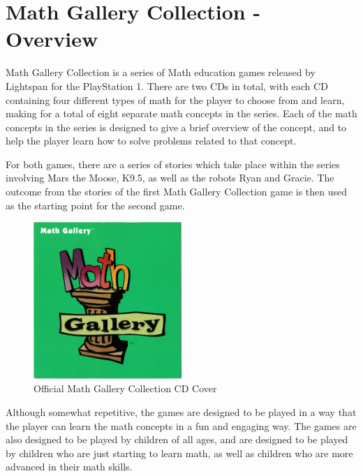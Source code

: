 \chapter{Math Gallery Collection - Overview}

Math Gallery Collection is a series of Math education games released by Lightspan for the PlayStation 1. There are two CDs in total, with each CD containing four different types of math for the player to choose from and learn, making for a total of eight separate math concepts in the series. Each of the math concepts in the series is designed to give a brief overview of the concept, and to help the player learn how to solve problems related to that concept.

For both games, there are a series of stories which take place within the series involving Mars the Moose, K9.5, as well as the robots Ryan and Gracie. The outcome from the stories of the first Math Gallery Collection game is then used as the starting point for the second game.

\begin{figure}[H]
    \centering
    \includegraphics[width=0.5\textwidth]{Games/MathGalleryCollection/Images/Category Cards - Math Gallery.jpg}
    \caption{Official Math Gallery Collection CD Cover}
\end{figure}

Although somewhat repetitive, the games are designed to be played in a way that the player can learn the math concepts in a fun and engaging way. The games are also designed to be played by children of all ages, and are designed to be played by children who are just starting to learn math, as well as children who are more advanced in their math skills.
